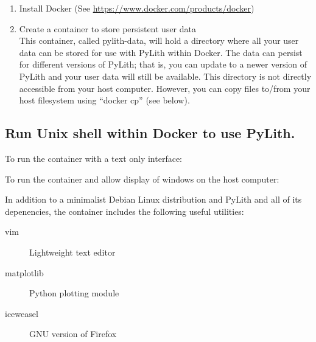 \begin{enumerate}
\item Install Docker (See \url{https://www.docker.com/products/docker})
\item Create a container to store persistent user data\\
  This container, called pylith-data, will hold a directory where all
  your user data can be stored for use with PyLith within Docker. The
  data can persist for different versions of PyLith; that is, you can
  update to a newer version of PyLith and your user data will still
  be available. This directory is not directly accessible from your
  host computer. However, you can copy files to/from your host filesystem
  using ``docker cp'' (see below).
\end{enumerate}

\subsection{Run Unix shell within Docker to use PyLith.}

To run the container with a text only interface:

To run the container and allow display of windows on the host computer:

In addition to a minimalist Debian Linux distribution and PyLith and
all of its depenencies, the container includes the following useful
utilities:
\begin{description}
\item[vim] Lightweight text editor
\item[matplotlib] Python plotting module
\item[iceweasel] GNU version of Firefox
\end{description}


